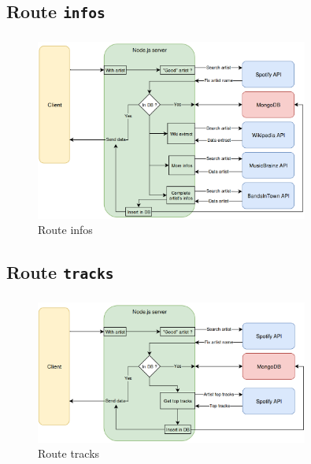 \documentclass[10pt]{beamer}
\begin{document}
\subsection{Route \texttt{infos}}
\begin{frame}
	\frametitle{\secname}
	\framesubtitle{\subsecname}
	\begin{figure}
		\begin{center}
			\includegraphics[width=0.8\textwidth]{images/infos.png}
		\end{center}
		\caption{Route infos}
	\end{figure}
\end{frame}

\subsection{Route \texttt{tracks}}
\begin{frame}
	\frametitle{\secname}
	\framesubtitle{\subsecname}
	\begin{figure}
		\begin{center}
			\includegraphics[width=0.8\textwidth]{images/tracks.png}
		\end{center}
		\caption{Route tracks}
	\end{figure}
\end{frame}
\end{document}
